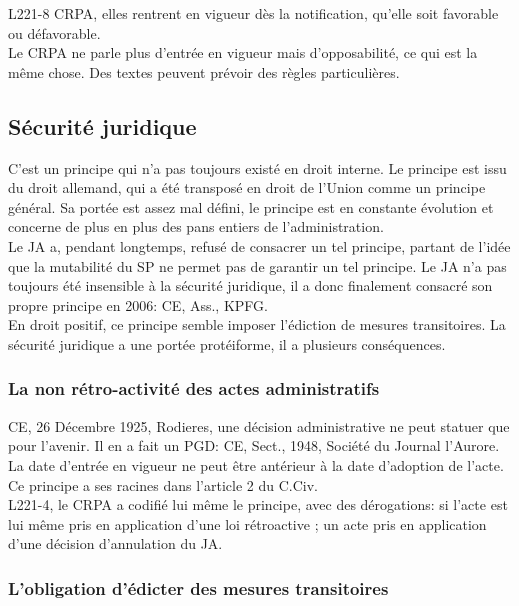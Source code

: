 \documentclass[10pt, a4paper, openany]{book}
\begin{document}
L221-8 CRPA, elles rentrent en vigueur dès la notification, qu'elle soit favorable ou défavorable. \\
Le CRPA ne parle plus d'entrée en vigueur mais d'opposabilité, ce qui est la même chose. Des textes peuvent prévoir des règles particulières.

\subsection{Sécurité juridique}

C'est un principe qui n'a pas toujours existé en droit interne. Le principe est issu du droit allemand, qui a été transposé en droit de l'Union comme un principe général. Sa portée est assez mal défini, le principe est en constante évolution et concerne de plus en plus des pans entiers de l'administration. \\
Le JA a, pendant longtemps, refusé de consacrer un tel principe, partant de l'idée que la mutabilité du SP ne permet pas de garantir un tel principe. Le JA n'a pas toujours été insensible à la sécurité juridique, il a donc finalement consacré son propre principe en 2006: CE, Ass., KPFG. \\
En droit positif, ce principe semble imposer l'édiction de mesures transitoires. La sécurité juridique a une portée protéiforme, il a plusieurs conséquences. 

\subsubsection{La non rétro-activité des actes administratifs}

CE, 26 Décembre 1925, Rodieres, une décision administrative ne peut statuer que pour l'avenir. Il en a fait un PGD: CE, Sect., 1948, Société du Journal l'Aurore. \\
La date d'entrée en vigueur ne peut être antérieur à la date d'adoption de l'acte.\\
Ce principe a ses racines dans l'article 2 du C.Civ. \\
L221-4, le CRPA a codifié lui même le principe, avec des dérogations: si l'acte est lui même pris en application d'une loi rétroactive ; un acte pris en application d'une décision d'annulation du JA. 

\subsubsection{L'obligation d'édicter des mesures transitoires}
\end{document}
